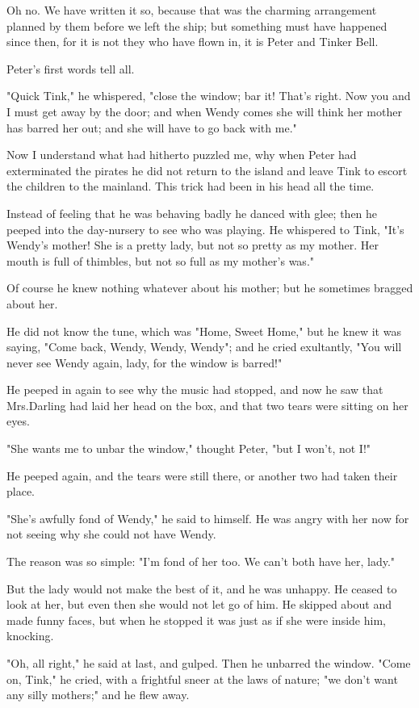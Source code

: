 Oh no.
We have written it so, because that was the charming arrangement planned by them before we left the ship;
but something must have happened since then, for it is not they who have flown in, it is Peter and Tinker Bell.

Peter's first words tell all.

"Quick Tink," he whispered, "close the window;
bar it!
That's right.
Now you and I must get away by the door;
and when Wendy comes she will think her mother has barred her out;
and she will have to go back with me."

Now I understand what had hitherto puzzled me, why when Peter had exterminated the pirates he did not return to the island and leave Tink to escort the children to the mainland.
This trick had been in his head all the time.

Instead of feeling that he was behaving badly he danced with glee;
then he peeped into the day-nursery to see who was playing.
He whispered to Tink, "It's Wendy's mother!
She is a pretty lady, but not so pretty as my mother.
Her mouth is full of thimbles, but not so full as my mother's was."

Of course he knew nothing whatever about his mother;
but he sometimes bragged about her.

He did not know the tune, which was "Home, Sweet Home," but he knew it was saying, "Come back, Wendy, Wendy, Wendy";
and he cried exultantly, "You will never see Wendy again, lady, for the window is barred!"

He peeped in again to see why the music had stopped, and now he saw that Mrs.\@ Darling had laid her head on the box, and that two tears were sitting on her eyes.

"She wants me to unbar the window," thought Peter, "but I won't, not I\@!"

He peeped again, and the tears were still there, or another two had taken their place.

"She's awfully fond of Wendy," he said to himself.
He was angry with her now for not seeing why she could not have Wendy.

The reason was so simple:
"I'm fond of her too.
We can't both have her, lady."

But the lady would not make the best of it, and he was unhappy.
He ceased to look at her, but even then she would not let go of him.
He skipped about and made funny faces, but when he stopped it was just as if she were inside him, knocking.

"Oh, all right," he said at last, and gulped.
Then he unbarred the window.
"Come on, Tink," he cried, with a frightful sneer at the laws of nature;
"we don't want any silly mothers;" and he flew away.

